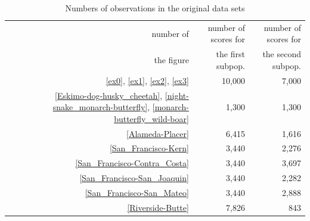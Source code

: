 \documentclass{article}
\begin{document}
\begin{table}
\caption{Numbers of observations in the original data sets}
\label{sizes}
\begin{center}
\begin{tabular}{rrr}
\hline
number of & number of scores for & number of scores for \\
the figure & the first subpop. & the second subpop. \\\hline
\ref{ex0}, \ref{ex1}, \ref{ex2}, \ref{ex3} & 10,000 & 7,000 \\
\ref{Eskimo-dog-husky_cheetah}, \ref{night-snake_monarch-butterfly},
\ref{monarch-butterfly_wild-boar} & 1,300 & 1,300 \\
\ref{Alameda-Placer} & 6,415 & 1,616 \\
\ref{San_Francisco-Kern} & 3,440 & 2,276 \\
\ref{San_Francisco-Contra_Costa} & 3,440 & 3,697 \\
\ref{San_Francisco-San_Joaquin} & 3,440 & 2,282 \\
\ref{San_Francisco-San_Mateo} & 3,440 & 2,888 \\
\ref{Riverside-Butte} & 7,826 & 843 \\
\hline
\end{tabular}
\end{center}
%
\vspace{-1.5em}
%
\end{table}
\end{document}
